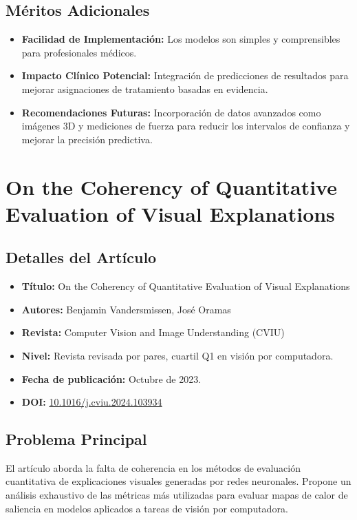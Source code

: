 \documentclass{report}
\begin{document}
\subsection{Méritos Adicionales}
\begin{itemize}
    \item \textbf{Facilidad de Implementación:} Los modelos son simples y comprensibles para profesionales médicos.
    \item \textbf{Impacto Clínico Potencial:} Integración de predicciones de resultados para mejorar asignaciones de tratamiento basadas en evidencia.
    \item \textbf{Recomendaciones Futuras:} Incorporación de datos avanzados como imágenes 3D y mediciones de fuerza para reducir los intervalos de confianza y mejorar la precisión predictiva.
\end{itemize}



\section{On the Coherency of Quantitative Evaluation of Visual Explanations}

\subsection{Detalles del Artículo}
\begin{itemize}
    \item \textbf{Título:} On the Coherency of Quantitative Evaluation of Visual Explanations
    \item \textbf{Autores:} Benjamin Vandersmissen, José Oramas
    \item \textbf{Revista:} Computer Vision and Image Understanding (CVIU)
    \item \textbf{Nivel:} Revista revisada por pares, cuartil Q1 en visión por computadora.
    \item \textbf{Fecha de publicación:} Octubre de 2023.
    \item \textbf{DOI:} \href{https://doi.org/10.1016/j.cviu.2024.103934}{10.1016/j.cviu.2024.103934}
\end{itemize}

\subsection{Problema Principal}
El artículo aborda la falta de coherencia en los métodos de evaluación cuantitativa de explicaciones visuales generadas por redes neuronales. Propone un análisis exhaustivo de las métricas más utilizadas para evaluar mapas de calor de saliencia en modelos aplicados a tareas de visión por computadora.
\end{document}
